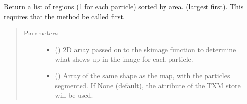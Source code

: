 \documentclass[letterpaper,10pt,english]{sphinxmanual}
\begin{document}
\begin{fulllineitems}
\begin{fulllineitems}
\begin{quote}
\begin{description}
\begin{itemize}
\end{itemize}

\end{description}\end{quote}

\end{fulllineitems}


\begin{fulllineitems}
\label{\detokenize{xanespy:xanespy.xanes_frameset.XanesFrameset.num_energies}}
\end{fulllineitems}


\begin{fulllineitems}
\label{\detokenize{xanespy:xanespy.xanes_frameset.XanesFrameset.num_timesteps}}
\end{fulllineitems}


\begin{fulllineitems}
\label{\detokenize{xanespy:xanespy.xanes_frameset.XanesFrameset.particle_regions}}
Return a list of regions (1 for each particle) sorted by area.
(largest first). This requires that the 
method be called first.
\begin{quote}\begin{description}
\item[{Parameters}] \leavevmode\begin{itemize}
\item {} 
 (\sphinxstyleliteralemphasis{, }) \textendash{} 2D array passed on to the skimage  function to
determine what shows up in the image for each particle.

\item {} 
 (\sphinxstyleliteralemphasis{, }) \textendash{} Array of the same shape as the map, with the particles
segmented. If None (default), the 
attribute of the TXM store will be used.


\end{itemize}
\end{description}
\end{quote}
\end{fulllineitems}
\end{fulllineitems}
\end{document}
